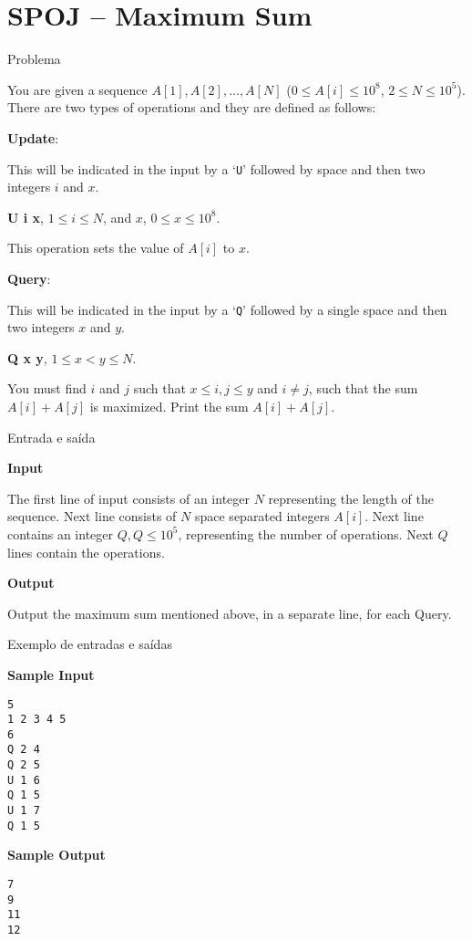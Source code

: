 \section{SPOJ -- Maximum Sum}

\begin{frame}[fragile]{Problema}

You are given a sequence $A[1], A[2], \ldots, A[N]$ ($0 \leq A[i] \leq 10^8$, $2 \leq N \leq 10^5$).
There are two types of operations and they are defined as follows:

\textbf{Update}:

This will be indicated in the input by a `\texttt{U}' followed by space and then two integers 
$i$ and $x$.

\textbf{U i x}, $1 \leq i \leq N$, and $x$, $0 \leq x \leq 10^8$.

This operation sets the value of $A[i]$ to $x$.

\textbf{Query}:

This will be indicated in the input by a `\texttt{Q}' followed by a single space and then two 
integers $x$ and $y$.

\textbf{Q x y}, $1 \leq x < y \leq N$.

You must find $i$ and $j$ such that $x \leq i, j \leq y$ and $i \neq j$, such that the sum 
$A[i]+A[j]$ is maximized. Print the sum $A[i]+A[j]$.

\end{frame}

\begin{frame}[fragile]{Entrada e saída}

\textbf{Input}

The first line of input consists of an integer $N$ representing the length of the sequence. Next 
line consists of $N$ space separated integers $A[i]$. Next line contains an integer 
$Q, Q \leq 10^5$, representing the number of operations. Next $Q$ lines contain the operations.

\textbf{Output}

Output the maximum sum mentioned above, in a separate line, for each Query.

\end{frame}

\begin{frame}[fragile]{Exemplo de entradas e saídas}

\begin{minipage}[t]{0.5\textwidth}
\textbf{Sample Input}
\begin{verbatim}
5
1 2 3 4 5
6
Q 2 4
Q 2 5
U 1 6
Q 1 5
U 1 7
Q 1 5
\end{verbatim}
\end{minipage}
\begin{minipage}[t]{0.45\textwidth}
\textbf{Sample Output}
\begin{verbatim}
7
9
11
12
\end{verbatim}
\end{minipage}
\end{frame}


